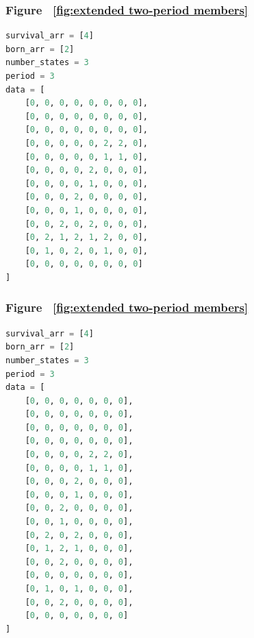 \documentclass[12pt]{article}
\numberwithin{figure}{section} %
\begin{document}
\noindent\begin{minipage}{.5\textwidth}
\subsubsection{Figure ~\ref{fig:extended two-period members}}
\label{subsubsection:extended two-period members(4/5)}
\begin{lstlisting}[language = Python]
survival_arr = [4]
born_arr = [2]
number_states = 3
period = 3 
data = [
    [0, 0, 0, 0, 0, 0, 0, 0],
    [0, 0, 0, 0, 0, 0, 0, 0],
    [0, 0, 0, 0, 0, 0, 0, 0],
    [0, 0, 0, 0, 0, 2, 2, 0],
    [0, 0, 0, 0, 0, 1, 1, 0],
    [0, 0, 0, 0, 2, 0, 0, 0],
    [0, 0, 0, 0, 1, 0, 0, 0],
    [0, 0, 0, 2, 0, 0, 0, 0],
    [0, 0, 0, 1, 0, 0, 0, 0],
    [0, 0, 2, 0, 2, 0, 0, 0],
    [0, 2, 1, 2, 1, 2, 0, 0],
    [0, 1, 0, 2, 0, 1, 0, 0],
    [0, 0, 0, 0, 0, 0, 0, 0]
]

\end{lstlisting}
\end{minipage}\hfill
\begin{minipage}{.45\textwidth}
\subsubsection{Figure ~\ref{fig:extended two-period members}}
\label{subsubsection:extended two-period members(5/5)}
\begin{lstlisting}[language = Python]
survival_arr = [4]
born_arr = [2]
number_states = 3
period = 3
data = [
    [0, 0, 0, 0, 0, 0, 0],
    [0, 0, 0, 0, 0, 0, 0],
    [0, 0, 0, 0, 0, 0, 0],
    [0, 0, 0, 0, 0, 0, 0],
    [0, 0, 0, 0, 2, 2, 0],
    [0, 0, 0, 0, 1, 1, 0],
    [0, 0, 0, 2, 0, 0, 0],
    [0, 0, 0, 1, 0, 0, 0],
    [0, 0, 2, 0, 0, 0, 0],
    [0, 0, 1, 0, 0, 0, 0],
    [0, 2, 0, 2, 0, 0, 0],
    [0, 1, 2, 1, 0, 0, 0],
    [0, 0, 2, 0, 0, 0, 0],
    [0, 0, 0, 0, 0, 0, 0],
    [0, 1, 0, 1, 0, 0, 0],
    [0, 0, 2, 0, 0, 0, 0],
    [0, 0, 0, 0, 0, 0, 0]
]
\end{lstlisting}
\end{minipage}
\end{document}
